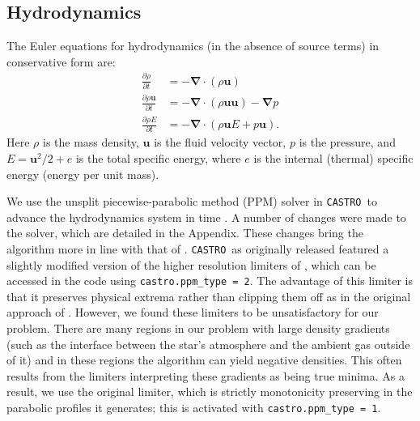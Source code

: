 \documentclass[iop]{../emulateapj}
\newcommand{\castro}{\texttt{CASTRO}}
\begin{document}
\subsection{Hydrodynamics}\label{sec:Hydrodynamics}

The Euler equations for hydrodynamics (in the absence of source terms) in conservative form are:
\begin{align}
  \frac{\partial \rho}{\partial t} &= -\bm{\nabla} \cdot (\rho \mathbf{u}) \label{eq:euler_density}\\
  \frac{\partial \rho \mathbf{u}}{\partial t} &= -\bm{\nabla} \cdot (\rho \mathbf{u}\mathbf{u}) - \bm{\nabla}p \label{eq:euler_momentum}\\
  \frac{\partial \rho E}{\partial t} &= -\bm{\nabla}\cdot(\rho\mathbf{u}E + p\mathbf{u}). \label{eq:euler_energy}
\end{align}
Here $\rho$ is the mass density, $\mathbf{u}$ is the fluid velocity
vector, $p$ is the pressure, and $E = \mathbf{u}^2 / 2 + e$ is the
total specific energy, where $e$ is the internal (thermal) specific
energy (energy per unit mass).

We use the unsplit piecewise-parabolic method (PPM) solver in \castro\
to advance the hydrodynamics system in time \citep{ppmunsplit}.  A
number of changes were made to the solver, which are detailed in the
Appendix.  These changes bring the algorithm more in line with that of
\cite{ppm}. \castro\ as originally released featured a slightly modified
version of the higher resolution limiters of
\cite{colella_sekora:2008}, which can be accessed in the code using
\texttt{castro.ppm\_type = 2}. The advantage of this limiter is that
it preserves physical extrema rather than clipping them off as in the
original approach of \cite{ppm}. However, we found these limiters to
be unsatisfactory for our problem. There are many regions in our
problem with large density gradients (such as the interface between
the star's atmosphere and the ambient gas outside of it) and in these
regions the algorithm can yield negative densities. This often results
from the limiters interpreting these gradients as being true
minima. As a result, we use the original limiter, which is strictly
monotonicity preserving in the parabolic profiles it generates; this
is activated with \texttt{castro.ppm\_type = 1}.
\end{document}
